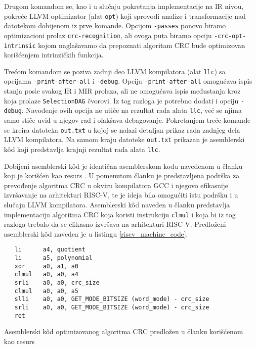 \documentclass[12pt,oneside]{memoir}
\begin{document}
Drugom komandom se, kao i u slučaju pokretanja implementacije na IR nivou, pokreće LLVM optimizator (alat \texttt{opt}) koji sprovodi analize i transformacije nad datotekom dobijenom iz prve komande. Opcijom \texttt{-passes} ponovo biramo optimizacioni prolaz  \texttt{crc-recognition}, ali ovoga puta biramo opciju \texttt{-crc-opt-intrinsic} kojom naglašavamo da prepoznati algoritam CRC bude optimizovan korišćenjem intrinzičkih funkcija.

Trećom komandom se poziva zadnji deo LLVM kompilatora (alat \texttt{llc}) sa opcijama \texttt{-print-after-all} i \texttt{-debug}. Opcija \texttt{-print-after-all} omogućava ispis stanja posle svakog IR i MIR prolaza, ali ne omogućava ispis međustanja kroz koja prolaze \texttt{SelectionDAG} čvorovi. Iz tog razloga je potrebno dodati i opciju \texttt{-debug}. Navođenje ovih opcija ne utiče na rezultat rada alata \texttt{llc}, već se njima samo stiče uvid u njegov rad i olakšava debagovanje. Pokretanjem treće komande se kreira datoteka \texttt{out.txt} u kojoj se nalazi detaljan prikaz rada zadnjeg dela LLVM kompilatora. Na samom kraju datoteke \texttt{out.txt}  prikazan je asemblerski k\^od koji predstavlja krajnji rezultat rada alata \texttt{llc}. 

Dobijeni asemblerski k\^od je identičan asemblerskom kodu navedenom u članku koji je korišćen kao resurs \cite{patch_about_crc_support}. U pomenutom članku je predstavljena podrška za prevođenje algoritma CRC u okviru kompilatora GCC i njegovo efikasnije izvršavanje na arhitekturi RISC-V, te je ideja bila omogućiti istu podršku i u slučaju LLVM kompilatora. Asemblerski k\^od naveden u članku predstavlja implementaciju algoritma CRC koja koristi instrukciju \texttt{clmul} i koja bi iz tog razloga trebalo da se efikasno izvršava na arhitekturi RISC-V. Predloženi asemblerski k\^od naveden je u listingu \ref{riscv_machine_code}.

\begin{listing}[!ht]
\begin{verbatim}
   li      a4, quotient
   li      a5, polynomial
   xor     a0, a1, a0
   clmul   a0, a0, a4
   srli    a0, a0, crc_size
   clmul   a0, a0, a5
   slli    a0, a0, GET_MODE_BITSIZE (word_mode) - crc_size
   srli    a0, a0, GET_MODE_BITSIZE (word_mode) - crc_size
   ret
\end{verbatim}
\caption{Asemblerski k\^od optimizovanog algoritma CRC predložen u članku \cite{patch_about_crc_support} korišćenom kao resurs}
\label{riscv_machine_code}
\centering
\end{listing}
\end{document}
